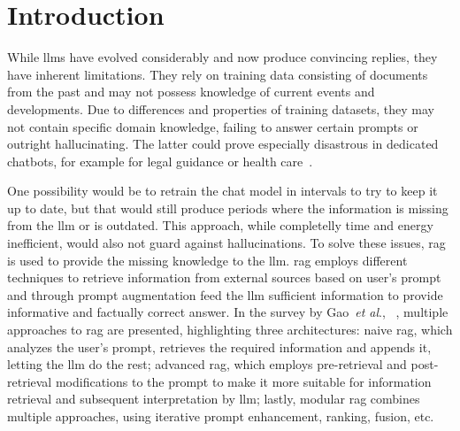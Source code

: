 \documentclass[fleqn,moreauthors,10pt]{ds_report}
\affiliation{\textit{Advisors: Aleš Žagar}}
\newcommand{\etal}{\textit{et al}., }
\begin{document}
\flushbottom 

\maketitle 

\thispagestyle{empty} 


\section*{Introduction}
	
While \acp{llm} have evolved considerably and now produce convincing replies, they have inherent limitations. They rely on training data consisting of documents from the past and may not possess knowledge of current events and developments. Due to differences and properties of training datasets, they may not contain specific domain knowledge, failing to answer certain prompts or outright hallucinating. The latter could prove especially disastrous in dedicated chatbots, for example for legal guidance or health care~\cite{thirunavukarasu2023large}.

One possibility would be to retrain the chat model in intervals to try to keep it up to date, but that would still produce periods where the information is missing from the \ac{llm} or is outdated. This approach, while completelly time and energy inefficient, would also not guard against hallucinations. To solve these issues, \ac{rag} is used to provide the missing knowledge to the \ac{llm}. \ac{rag} employs different techniques to retrieve information from external sources based on user’s prompt and through prompt augmentation feed the \ac{llm} sufficient information to provide informative and factually correct answer. In the survey by Gao~\etal~\cite{survey}, multiple approaches to \ac{rag} are presented, highlighting three architectures: naive \ac{rag}, which analyzes the user’s prompt, retrieves the required information and appends it, letting the \ac{llm} do the rest; advanced \ac{rag}, which employs pre-retrieval and post-retrieval modifications to the prompt to make it more suitable for information retrieval and subsequent interpretation by \ac{llm}; lastly, modular \ac{rag} combines multiple approaches, using iterative prompt enhancement, ranking, fusion, etc.
\end{document}
